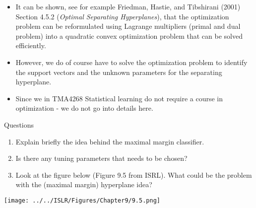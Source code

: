 \documentclass[10pt,ignorenonframetext,]{beamer}
\providecommand{\tightlist}{%
  \setlength{\itemsep}{0pt}\setlength{\parskip}{0pt}}
\begin{document}
\begin{frame}

\begin{itemize}
\tightlist
\item
  It can be shown, see for example Friedman, Hastie, and Tibshirani
  (2001) Section 4.5.2 (\emph{Optimal Separating Hyperplanes}), that the
  optimization problem can be reformulated using Lagrange multipliers
  (primal and dual problem) into a quadratic convex optimization problem
  that can be solved efficiently.
\end{itemize}

\vspace{2mm}

\begin{itemize}
\tightlist
\item
  However, we do of course have to solve the optimization problem to
  identify the support vectors and the unknown parameters for the
  separating hyperplane.
\end{itemize}

\vspace{2mm}

\begin{itemize}
\tightlist
\item
  Since we in TMA4268 Statistical learning do not require a course in
  optimization - we do not go into details here.
\end{itemize}

\end{frame}

\begin{frame}

\begin{block}{Questions}

\begin{enumerate}
\def\labelenumi{\arabic{enumi}.}
\item
  Explain briefly the idea behind the maximal margin classifier.
\item
  Is there any tuning parameters that needs to be chosen?
\item
  Look at the figure below (Figure 9.5 from ISRL). What could be the
  problem with the (maximal margin) hyperplane idea?
\end{enumerate}

\centering
\texttt{[image: ../../ISLR/Figures/Chapter9/9.5.png]}

\end{block}

\end{frame}
\end{document}
